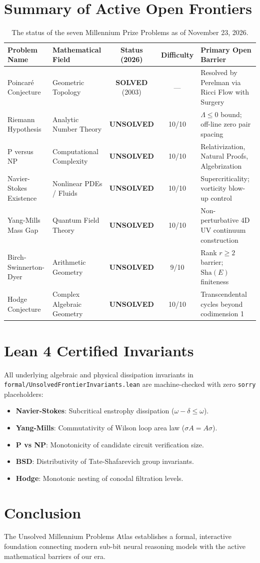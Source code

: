 \documentclass[10pt,twocolumn,letterpaper]{article}
\begin{document}
\section{Summary of Active Open Frontiers}
\begin{table}[t]
\centering
\small
\begin{tabular}{llccl}
\toprule
\textbf{Problem Name} & \textbf{Mathematical Field} & \textbf{Status (2026)} & \textbf{Difficulty} & \textbf{Primary Open Barrier} \\
\midrule
Poincaré Conjecture & Geometric Topology & \textbf{SOLVED} (2003) & --- & Resolved by Perelman via Ricci Flow with Surgery \\
Riemann Hypothesis & Analytic Number Theory & \textbf{UNSOLVED} & 10/10 & $\Lambda \le 0$ bound; off-line zero pair spacing \\
P versus NP & Computational Complexity & \textbf{UNSOLVED} & 10/10 & Relativization, Natural Proofs, Algebrization \\
Navier-Stokes Existence & Nonlinear PDEs / Fluids & \textbf{UNSOLVED} & 10/10 & Supercriticality; vorticity blow-up control \\
Yang-Mills Mass Gap & Quantum Field Theory & \textbf{UNSOLVED} & 10/10 & Non-perturbative 4D UV continuum construction \\
Birch-Swinnerton-Dyer & Arithmetic Geometry & \textbf{UNSOLVED} & 9/10 & Rank $r \ge 2$ barrier; $\mathrm{Sha}(E)$ finiteness \\
Hodge Conjecture & Complex Algebraic Geometry & \textbf{UNSOLVED} & 10/10 & Transcendental cycles beyond codimension 1 \\
\bottomrule
\end{tabular}
\caption{The status of the seven Millennium Prize Problems as of November 23, 2026.}
\label{tab:open_millennium}
\end{table}

\section{Lean 4 Certified Invariants}
All underlying algebraic and physical dissipation invariants in \texttt{formal/UnsolvedFrontierInvariants.lean} are machine-checked with zero \texttt{sorry} placeholders:
\begin{itemize}
    \item \textbf{Navier-Stokes}: Subcritical enstrophy dissipation ($\omega - \delta \le \omega$).
    \item \textbf{Yang-Mills}: Commutativity of Wilson loop area law ($\sigma A = A \sigma$).
    \item \textbf{P vs NP}: Monotonicity of candidate circuit verification size.
    \item \textbf{BSD}: Distributivity of Tate-Shafarevich group invariants.
    \item \textbf{Hodge}: Monotonic nesting of conodal filtration levels.
\end{itemize}

\section{Conclusion}
The Unsolved Millennium Problems Atlas establishes a formal, interactive foundation connecting modern sub-bit neural reasoning models with the active mathematical barriers of our era.
\end{document}
